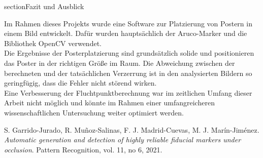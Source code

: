 \documentclass[a4paper,twocolumn]{article}
\begin{document}
section{Fazit und Ausblick}

Im Rahmen dieses Projekts wurde eine Software zur Platzierung von Postern in einem Bild entwickelt. Dafür wurden hauptsächlich der Aruco-Marker und die Bibliothek OpenCV verwendet.
\\
Die Ergebnisse der Posterplatzierung sind grundsätzlich solide und positionieren das Poster in der richtigen Größe im Raum. Die Abweichung zwischen der berechneten und der tatsächlichen Verzerrung ist in den analysierten Bildern so geringfügig, dass die Fehler nicht störend wirken.
\\
Eine Verbesserung der Fluchtpunktberechnung war im zeitlichen Umfang dieser Arbeit nicht möglich und könnte im Rahmen einer umfangreicheren wissenschaftlichen Untersuchung weiter optimiert werden.


\begin{thebibliography}{9}
    S. Garrido-Jurado, R. Muñoz-Salinas, F. J. Madrid-Cuevas, M. J. Marín-Jiménez. 
    \textit{Automatic generation and detection of highly reliable fiducial markers under occlusion}. Pattern Recognition, vol. 11, no 6, 2021.

\end{thebibliography}
\end{document}
